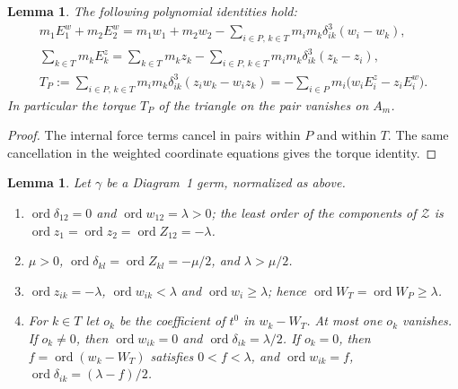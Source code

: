 \documentclass[11pt]{amsart}
\newenvironment{romanlist}{\begin{enumerate}\renewcommand{\labelenumi}{(\roman{enumi})}%
  \renewcommand{\theenumi}{\roman{enumi}}}{\end{enumerate}}
\newtheorem{lemma}[theorem]{Lemma}
\theoremstyle{definition}
\theoremstyle{remark}
\newcommand{\ord}{\operatorname{ord}}
\begin{document}
\begin{lemma}\label{lem:d1-syzygies}
{The following polynomial identities hold:}
\begin{gather*}
  m_1E^w_1+m_2E^w_2=m_1w_1+m_2w_2-\sum_{i\in P,\,k\in T}m_im_k\delta_{ik}^3(w_i-w_k),\\
  \sum_{k\in T}m_kE^z_k=\sum_{k\in T}m_kz_k-\sum_{i\in P,\,k\in T}m_im_k\delta_{ik}^3(z_k-z_i),\\
  T_P:=\sum_{i\in P,\,k\in T}m_im_k\delta_{ik}^3(z_iw_k-w_iz_k)
  =-\sum_{i\in P}m_i\big(w_iE^z_i-z_iE^w_i\big).
\end{gather*}
In particular the torque $T_P$ of the triangle on the pair vanishes on $A_m$.
\end{lemma}

\begin{proof}
{The internal force terms cancel in pairs within $P$ and within $T$.
The same cancellation in the weighted coordinate equations gives the torque identity.}
\end{proof}

\begin{lemma}\label{lem:d1-orders}
Let $\gamma$ be a Diagram~1 germ, normalized as above.
\begin{romanlist}
  \item $\ord\delta_{12}=0$ and $\ord w_{12}=\lambda>0$; the least order of the components of
  $\mathcal Z$ is $\ord z_1=\ord z_2=\ord Z_{12}=-\lambda$.
  \item $\mu>0$, $\ord\delta_{kl}=\ord Z_{kl}=-\mu/2$, and $\lambda>\mu/2$.
  \item $\ord z_{ik}=-\lambda$, $\ord w_{ik}<\lambda$ and $\ord w_i\ge\lambda$; hence
  $\ord W_T=\ord W_P\ge\lambda$.
  \item For $k\in T$ let $o_k$ be the coefficient of $t^0$ in $w_k-W_T$.  At most one $o_k$
  vanishes.  If $o_k\ne0$, then $\ord w_{ik}=0$ and $\ord\delta_{ik}=\lambda/2$.  If $o_k=0$, then
  $f=\ord(w_k-W_T)$ satisfies $0<f<\lambda$, and $\ord w_{ik}=f$, $\ord\delta_{ik}=(\lambda-f)/2$.
\end{romanlist}
\end{lemma}
\end{document}
